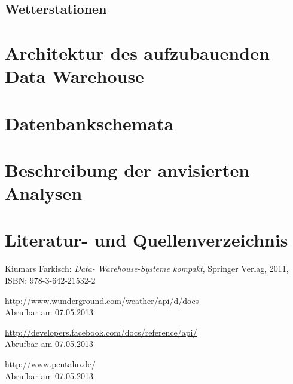 \documentclass[a4paper,12pt]{scrartcl}
\begin{document}
\subsection{Wetterstationen}


\section{Architektur des aufzubauenden Data Warehouse}

\section{Datenbankschemata}

\section{Beschreibung der anvisierten Analysen}


\clearpage
\section{Literatur- und Quellenverzeichnis}

\renewcommand\refname{Literaturverzeichnis}
\begin{thebibliography}{999}

Kiumars Farkisch:  {\sl Data- Warehouse-Systeme kompakt}, Springer Verlag, 2011,
\\ISBN:  978-3-642-21532-2

\end{thebibliography}

\renewcommand\refname{Quellenverzeichnis}
\begin{thebibliography}{999}

\url{http://www.wunderground.com/weather/api/d/docs}
\\Abrufbar am 07.05.2013


\url{http://developers.facebook.com/docs/reference/api/}
\\Abrufbar am 07.05.2013


\url{http://www.pentaho.de/}
\\Abrufbar am 07.05.2013


\end{thebibliography}
\end{document}
